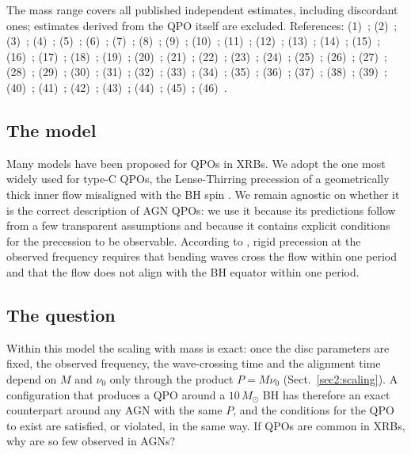 \begin{table}
{The mass range covers all published independent estimates, including discordant ones; estimates derived from the QPO itself are excluded.
References:
(1)~\citet{Gierlinski2008}; (2)~\citet{Alston2014}; (3)~\citet{Czerny2016};
(4)~\citet{Alston2015}; (5)~\citet{Grupe2010}; (6)~\citet{Shields2003};
(7)~\citet{Zhang2017}; (8)~\citet{BentzKatz2015}; (9)~\citet{Bentz2009}; (10)~\citet{Giacche2014};
(11)~\citet{Gupta2018}; (12)~\citet{Bentz2016}; (13)~\citet{Das2025};
(14)~\citet{Zhang2020}; (15)~\citet{Cackett2013};
(16)~\citet{Carpano2018};
(17)~\citet{Lin2013}; (18)~\citet{Ho2012}; (19)~\citet{Cao2025};
(20)~\citet{Smith2020}; (21)~\citet{Greenhill1997}; (22)~\citet{Braatz2003}; (23)~\citet{Gaspar2022};
(24)~\citet{j1257}; (25)~\citet{massa};
(26)~\citet{Masterson2025}; (27)~\citet{Masterson2026}; (28)~\citet{Li2022};
(29)~\citet{Pan2016}; (30)~\citet{Zhang2018a}; (31)~\citet{ZhouWang2005}; (32)~\citet{DoneJin2016}; (33)~\citet{Titarchuk2025};
(34)~\citet{Yan2024}; (35)~\citet{Fazeli2019}; (36)~\citet{Combes2019}; (37)~\citet{Risaliti2009};
(38)~\citet{Zhang2025}; (39)~\citet{Gofford2015};
(40)~\citet{Zhong2024}; (41)~\citet{Du2014}; (42)~\citet{Li2018};
(43)~\citet{Yan2025}; (44)~\citet{Bentz2006}; (45)~\citet{Onken2014}; (46)~\citet{Roberts2021}.
}
\end{table}

\subsection{The model}
Many models have been proposed for QPOs in XRBs.
We adopt the one most widely used for type-C QPOs, the Lense-Thirring precession of a geometrically thick inner flow misaligned with the BH spin \citep{PIF}.
We remain agnostic on whether it is the correct description of AGN QPOs: we use it because its predictions follow from a few transparent assumptions and because it contains explicit conditions for the precession to be observable.
According to \citet{Motta2017}, rigid precession at the observed frequency requires that bending waves cross the flow within one period and that the flow does not align with the BH equator within one period.

\subsection{The question}
Within this model the scaling with mass is exact: once the disc parameters are fixed, the observed frequency, the wave-crossing time and the alignment time depend on $M$ and $\nu_0$ only through the product $P=M\nu_0$ (Sect.~\ref{sec2:scaling}).
A configuration that produces a QPO around a $10\,M_\odot$ BH has therefore an exact counterpart around any AGN with the same $P$, and the conditions for the QPO to exist are satisfied, or violated, in the same way.
If QPOs are common in XRBs, why are so few observed in AGNs?

